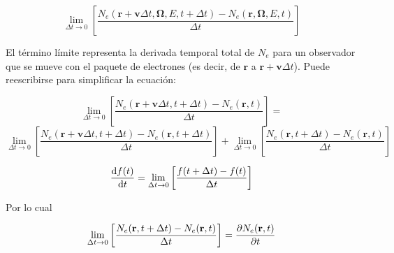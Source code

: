 \documentclass[aspectratio=169,xcolor=dvipsnames,t]{beamer}
\newcommand{\be}{\begin{equation*}}
\newcommand{\ee}{\end{equation*}}
\newcommand{\kl}{\left[}
\newcommand{\kr}{\right]}
\begin{document}
\begin{frame}

    \be
    \lim_{\Delta t  \rightarrow 0} \kl \frac{N_e(\mathbf{r} + \mathbf{v} \Delta t, \bm{\Omega}, E, t + \Delta t) - N_e(\mathbf{r},\bm{\Omega}, E, t)}{\Delta t} \kr
    \ee

    El término límite representa la derivada temporal total de $N_e$ para un observador que se mueve con el paquete de electrones (es decir, de $\mathbf{r}$ a $\mathbf{r} + \mathbf{v} \Delta t$). Puede reescribirse para simplificar la ecuación:

    \be
    \lim_{\Delta t  \rightarrow 0} \kl \frac{N_e(\mathbf{r} + \mathbf{v} \Delta t, t + \Delta t) - N_e(\mathbf{r}, t)}{\Delta t} \kr = 
    \ee
    \be
    \lim_{\Delta t  \rightarrow 0} \kl \frac{N_e(\mathbf{r} + \mathbf{v} \Delta t, t + \Delta t) - N_e(\mathbf{r}, t + \Delta t)}{\Delta t} \kr + \lim_{\Delta t  \rightarrow 0} \kl \frac{N_e(\mathbf{r}, t + \Delta t) - N_e(\mathbf{r}, t)}{\Delta t} \kr
    \ee

\end{frame}

\begin{frame}

    \vspace{1.4cm}

    \begin{center}
        \begin{tcolorbox}[colback=gray!25!white,colframe=gray, title=\textbf{Definición de derivada},width=0.45\linewidth, center title]
            \vspace{-0.4cm}
            \be
                \dv{f(t)}{t} = \lim_{\Delta t  \rightarrow 0} \kl \frac{f(t + \Delta t) - f(t)}{\Delta t} \kr
            \ee
        \end{tcolorbox}
    \end{center}

    Por lo cual

    \be
    \lim_{\Delta t  \rightarrow 0} \kl \frac{N_e(\mathbf{r}, t + \Delta t) - N_e(\mathbf{r}, t)}{\Delta t} \kr = \pdv{N_e(\mathbf{r}, t)}{t}
    \ee

\end{frame}
\end{document}
